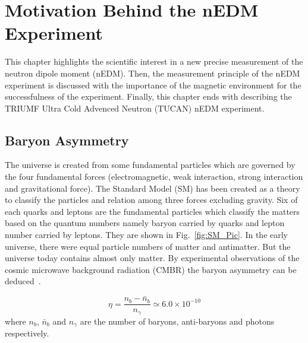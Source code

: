 \chapter{Motivation Behind the nEDM Experiment}
\label{ch:motivation} 
This chapter highlights the scientific interest in a new precise measurement of the neutron dipole moment (nEDM). Then, the measurement principle of the nEDM experiment is discussed with the importance of the magnetic environment for the successfulness of the experiment. Finally, this chapter ends with describing the TRIUMF Ultra Cold Advenced Neutron (TUCAN) nEDM experiment.

\section{Baryon Asymmetry}


The universe is created from some fundamental particles which are governed by the four fundamental forces (electromagnetic, weak interaction, strong interaction and gravitational force). The Standard Model (SM) has been created as a theory to classify the particles and relation among three forces excluding gravity. Six of each quarks and leptons are the fundamental particles which classify the matters based on the quantum numbers namely baryon carried by quarks and lepton number carried by leptons. They are shown in Fig.~\ref{fig:SM_Pic}. In the early universe, there were equal particle numbers of matter and antimatter. But the universe today contains almost only matter. By experimental observations of the cosmic microwave background radiation (CMBR) the baryon asymmetry can be deduced~\cite{expBar}.

\begin{equation}\label{eq:baryons}
    \eta =\frac{n_b-\bar{n}_b}{n_\gamma}\simeq6.0 \times 10^{-10}
\end{equation}
where $n_b$, $\bar{n}_b$ and ${n_\gamma}$ are the number of baryons, anti-baryons and photons respectively. 


